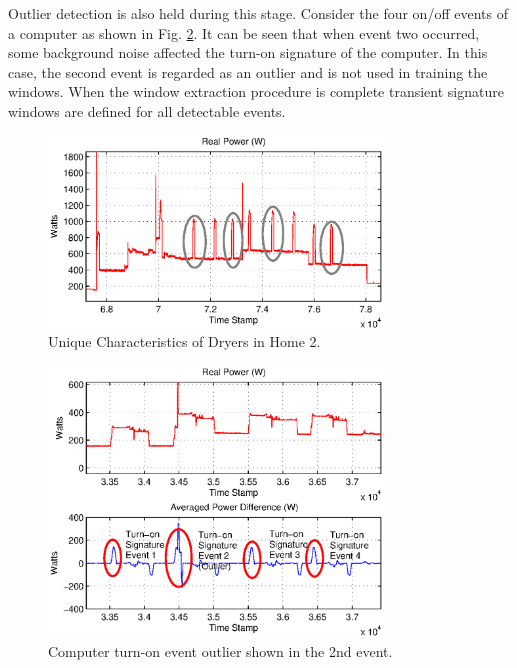 \documentclass[conference]{IEEEtran}
\begin{document}
Outlier detection is also held during this stage.  Consider the four on/off events of a computer as shown in Fig. \ref{fig:outlier}.  It can be seen that when event two occurred, some background noise affected the turn-on signature of the computer.  In this case, the second event is regarded as an outlier and is not used in training the windows.  When the window extraction procedure is complete transient signature windows are defined for all detectable events.  

\begin{figure}[!t]
	\centering
	\includegraphics[width=3.5in]{fig/dryerH2.eps}
	\caption{Unique Characteristics of Dryers in Home 2.}
	\label{fig:dryerH2}
\end{figure}
	
\begin{figure}[!t]
	\centering
	\includegraphics[width=3.5in]{fig/outlier.eps}
	\caption{Computer turn-on event outlier shown in the 2nd event.}
	\label{fig:outlier}
\end{figure}
\end{document}

